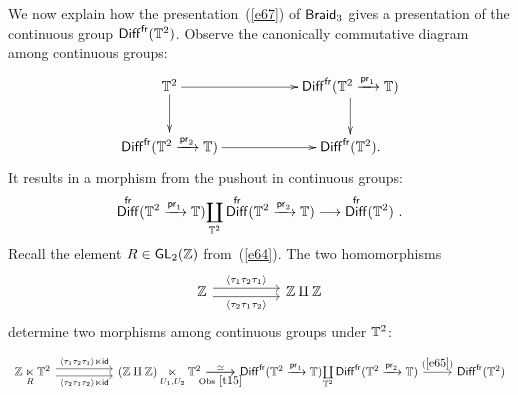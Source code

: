 \documentclass{amsart}
\theoremstyle{definition}
\theoremstyle{remark}
\DeclareMathOperator{\pr}{\mathsf{pr}}
\DeclareMathOperator{\Diff}{{\sf Diff}}
\DeclareMathOperator{\fr}{\sf fr}
\newcommand{\lag}{\langle}
\newcommand{\rag}{\rangle}
\newcommand{\xra}{\xrightarrow}
\DeclareMathOperator{\Braid}{{\sf Braid}_3}
\DeclareMathOperator{\GL}{\sf GL}
\DeclareMathOperator{\id}{\sf id}
\begin{document}
We now explain how the presentation~(\ref{e67}) of $\Braid$ gives a presentation of the continuous group $\Diff^{\fr}(\TT^2)$.
Observe the canonically commutative diagram among continuous groups:
\[
\xymatrix{
\TT^2 \ar[rr]
\ar[d]
&&
\Diff^{\fr}(\TT^2 \xra{\pr_1} \TT)
\ar[d]
\\
\Diff^{\fr}(\TT^2 \xra{\pr_2} \TT)
\ar[rr]
&&
\Diff^{\fr}(\TT^2)
.
}
\]
It results in a morphism from the pushout in continuous groups:
\begin{equation}
\label{e65}
\Diff^{\fr}(\TT^2\xra{\pr_1} \TT)
\underset{\TT^2}
\coprod
\Diff^{\fr}(\TT^2 \xra{\pr_2} \TT)
\longrightarrow
\Diff^{\fr}(\TT^2)
~.
\end{equation}
Recall the element $R \in \GL_2(\ZZ)$ from~(\ref{e64}).
The two homomorphisms
\[
\begin{tikzcd}
\ZZ \arrow[rr, yshift=0.7ex, "\lag \tau_{1} \tau_{2} \tau_{1}\rag"] \arrow[swap, rr, yshift=-0.7ex, "\lag \tau_{2} \tau_{1} \tau_{2}\rag"]
& 
& \ZZ \amalg \ZZ %
\end{tikzcd}
\]
determine two morphisms among continuous groups under $\mathbb T^2$:

\begin{equation} \label{e66}
\begin{tikzcd}
\ZZ \underset{R}\ltimes \TT^2 \arrow[rr, yshift=0.7ex, "\lag \tau_{1} \tau_{2} \tau_{1}\rag \ltimes \id"] \arrow[swap, rr, yshift=-0.7ex, "\lag \tau_{2} \tau_{1} \tau_{2}\rag \ltimes \id "]
&
&
(\ZZ \amalg \ZZ) \underset{U_1,U_2} \ltimes \TT^2
\arrow[r, "\simeq"]
\arrow[swap, r, "\rm Obs~\ref{t15}"]
&
\Diff^{\fr}(\TT^2\xra{\pr_1} \TT)
\underset{\TT^2}
\coprod
\Diff^{\fr}(\TT^2 \xra{\pr_2} \TT)
\arrow[r, "(\ref{e65})"]
&
\Diff^{\fr}(\TT^2)
\end{tikzcd}
\end{equation}
\end{document}

